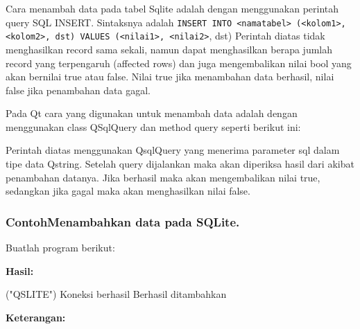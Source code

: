 Cara menambah data pada tabel Sqlite adalah dengan menggunakan perintah
query SQL INSERT. Sintaksnya adalah
\texttt{INSERT\ INTO\ \textless{}namatabel\textgreater{}\ (\textless{}kolom1\textgreater{},\textless{}kolom2\textgreater{},\ dst)\ VALUES\ (\textless{}nilai1\textgreater{},\ \textless{}nilai2\textgreater{}},
dst) Perintah diatas tidak menghasilkan record sama sekali, namun dapat
menghasilkan berapa jumlah record yang terpengaruh (affected rows) dan
juga mengembalikan nilai bool yang akan bernilai true atau false. Nilai
true jika menambahan data berhasil, nilai false jika penambahan data
gagal.

Pada Qt cara yang digunakan untuk menambah data adalah dengan
menggunakan class QSqlQuery dan method query seperti berikut ini:



Perintah diatas menggunakan QsqlQuery yang menerima parameter sql dalam
tipe data Qstring. Setelah query dijalankan maka akan diperiksa hasil
dari akibat penambahan datanya. Jika berhasil maka akan mengembalikan
nilai true, sedangkan jika gagal maka akan menghasilkan nilai false.

\subsubsection*{ContohMenambahkan data pada SQLite.}

Buatlah program berikut:



\textbf{Hasil:}

\begin{lcverbatim}
("QSLITE")
Koneksi berhasil
Berhasil ditambahkan
\end{lcverbatim}

\textbf{Keterangan:}

